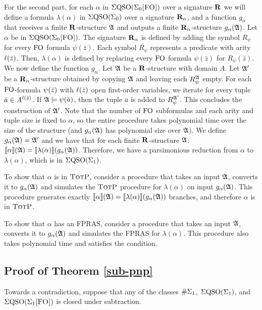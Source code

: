 \vspace{1em}
For the second part, for each $\alpha$ in $\Sigma{\rm QSO}(\Sigma_{0}\textsc{[FO]})$ over a signature $\mathbf{R}$ we will define a formula $\lambda(\alpha)$ in $\Sigma{\rm QSO}(\Sigma_{0})$ over a signature $\mathbf{R}_{\alpha}$, and a function $g_{\alpha}$ that receives a finite $\mathbf{R}$-structure $\mathfrak{A}$ and outputs a finite $\mathbf{R}_{\alpha}$-structure $g_{\alpha}(\mathfrak{A})$. Let $\alpha$ be in $\Sigma{\rm QSO}(\Sigma_{0}\textsc{[FO]})$. The signature $\mathbf{R}_{\alpha}$ is defined by adding the symbol $R_{\psi}$ for every ${\rm FO}$ formula $\psi(\bar{z})$. Each symbol $R_{\psi}$ represents a predicate with arity $\ell(\bar{z})$. Then, $\lambda(\alpha)$ is defined by replacing every ${\rm FO}$ formula $\psi(\bar{z})$ for $R_{\psi}(\bar{z})$. We now define the function $g_{\alpha}$. Let $\mathfrak{A}$ be a $\mathbf{R}$-structure with domain $A$. Let $\mathfrak{A}'$ be a $\mathbf{R}_{\alpha}$-structure obtained by copying $\mathfrak{A}$ and leaving each $R_{\psi}^{\mathfrak{A}}$ empty. For each ${\rm FO}$-formula $\psi(\bar{z})$ with $\ell(\bar{z})$ open first-order variables, we iterate for every tuple $\bar{a} \in A^{\ell(\bar{z})}$. If $\mathfrak{A}\models\psi(\bar{a})$, then the tuple $\bar{a}$ is added to $R_{\psi}^{\mathfrak{A}'}$. This concludes the construction of $\mathfrak{A}'$. Note that the number of ${\rm FO}$ subformulas and each arity and tuple size is fixed to $\alpha$, so the entire procedure takes polynomial time over the size of the structure (and $g_{\alpha}(\mathfrak{A})$ has polynomial size over $\mathfrak{A}$). We define $g_{\alpha}(\mathfrak{A}) = \mathfrak{A}'$ and we have that for each finite $\mathbf{R}$-structure $\mathfrak{A}$: ${\llbracket{}{\alpha}\rrbracket}(\mathfrak{A}) = {\llbracket{}{\lambda(\alpha)}\rrbracket}(g_{\alpha}(\mathfrak{A}))$. Therefore, we have a parsimonious reduction from $\alpha$ to $\lambda(\alpha)$, which is in $\Sigma{\rm QSO}(\Sigma_{1})$.

To show that $\alpha$ is in $\text{\sc TotP}$, consider a procedure that takes an input $\mathfrak{A}$, converts it to $g_{\alpha}(\mathfrak{A})$ and simulates the $\text{\sc TotP}$ procedure for $\lambda(\alpha)$ on input $g_{\alpha}(\mathfrak{A})$. This procedure generates exactly ${\llbracket{}{\alpha}\rrbracket}(\mathfrak{A}) = {\llbracket{}{\lambda(\alpha)}\rrbracket}(g_{\alpha}(\mathfrak{A}))$ branches, and therefore $\alpha$ is in $\text{\sc TotP}$.

To show that $\alpha$ has an FPRAS, consider a procedure that takes an input $\mathfrak{A}$, converts it to $g_{\alpha}(\mathfrak{A})$ and simulates the FPRAS for $\lambda(\alpha)$. This procedure also takes polynomial time and satisfies the condition.

\subsection*{Proof of Theorem \ref{sub-pnp}}

Towards a contradiction, suppose that any of the classes $\#\Sigma_{1}$, $\Sigma{\rm QSO}(\Sigma_{1})$, and $\Sigma{\rm QSO}(\Sigma_{1}\textsc{[FO]})$ is closed under subtraction.

